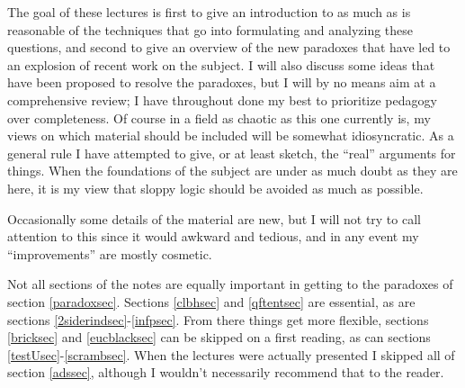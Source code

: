 \documentclass[12pt]{article}
\begin{document}
The goal of these lectures is first to give an introduction to as much as is reasonable of the techniques that go into formulating and analyzing these questions, and second to give an overview of the new paradoxes that have led to an explosion of recent work on the subject.  I will also discuss some ideas that have been proposed to resolve the paradoxes, but I will by no means aim at a comprehensive review; I have throughout done my best to prioritize pedagogy over completeness.  Of course in a field as chaotic as this one currently is, my views on which material should be included will be somewhat idiosyncratic.  As a general rule I have attempted to give, or at least sketch, the ``real'' arguments for things.  When the foundations of the subject are under as much doubt as they are here, it is my view that sloppy logic should be avoided as much as possible.

Occasionally some details of the material are new, but I will not try to call attention to this since it would awkward and tedious, and in any event my ``improvements'' are mostly cosmetic.  

Not all sections of the notes are equally important in getting to the paradoxes of section \ref{paradoxsec}.  Sections \ref{clbhsec} and \ref{qftentsec} are essential, as are sections \ref{2siderindsec}-\ref{infpsec}.  From there things get more flexible, sections \ref{bricksec} and \ref{eucblacksec} can be skipped on a first reading, as can sections \ref{testUsec}-\ref{scrambsec}.  When the lectures were actually presented I skipped all of section \ref{adssec}, although I wouldn't necessarily recommend that to the reader.
\end{document}
